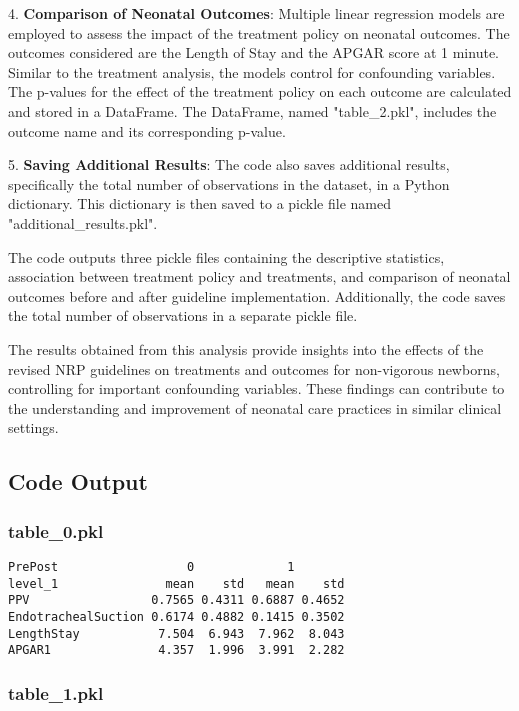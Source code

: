 \documentclass[11pt]{article}
\begin{document}
4. \textbf{Comparison of Neonatal Outcomes}: Multiple linear regression models are employed to assess the impact of the treatment policy on neonatal outcomes. The outcomes considered are the Length of Stay and the APGAR score at 1 minute. Similar to the treatment analysis, the models control for confounding variables. The p-values for the effect of the treatment policy on each outcome are calculated and stored in a DataFrame. The DataFrame, named "table\_2.pkl", includes the outcome name and its corresponding p-value.

5. \textbf{Saving Additional Results}: The code also saves additional results, specifically the total number of observations in the dataset, in a Python dictionary. This dictionary is then saved to a pickle file named "additional\_results.pkl".

The code outputs three pickle files containing the descriptive statistics, association between treatment policy and treatments, and comparison of neonatal outcomes before and after guideline implementation. Additionally, the code saves the total number of observations in a separate pickle file.

The results obtained from this analysis provide insights into the effects of the revised NRP guidelines on treatments and outcomes for non-vigorous newborns, controlling for important confounding variables. These findings can contribute to the understanding and improvement of neonatal care practices in similar clinical settings.

\subsection{Code Output}

\subsubsection*{table\_0.pkl}

\begin{Verbatim}[tabsize=4]
PrePost                  0             1
level_1               mean    std   mean    std
PPV                 0.7565 0.4311 0.6887 0.4652
EndotrachealSuction 0.6174 0.4882 0.1415 0.3502
LengthStay           7.504  6.943  7.962  8.043
APGAR1               4.357  1.996  3.991  2.282
\end{Verbatim}

\subsubsection*{table\_1.pkl}
\end{document}
